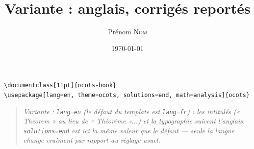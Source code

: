 \documentclass[11pt]{ocots-book}
\title{Variante : anglais, corrigés reportés}
\author{Prénom \textsc{Nom}}
\date{\today}
\newcommand{\ocotsvariantnote}[1]{\begin{quote}\itshape Variante : #1\end{quote}}
\begin{document}
\begin{lstlisting}
\documentclass[11pt]{ocots-book}
\usepackage[lang=en, theme=ocots, solutions=end, math=analysis]{ocots}
\end{lstlisting}
\ocotsvariantnote{\texttt{lang=en} (le défaut du template est \texttt{lang=fr})
: les intitulés (« Theorem » au lieu de « Théorème »...) et la typographie
suivent l'anglais. \texttt{solutions=end} est ici la même valeur que le
défaut — seule la langue change vraiment par rapport au réglage usuel.}

\ocotscollectsolutions

\ocotsprintsolutions
\end{document}
